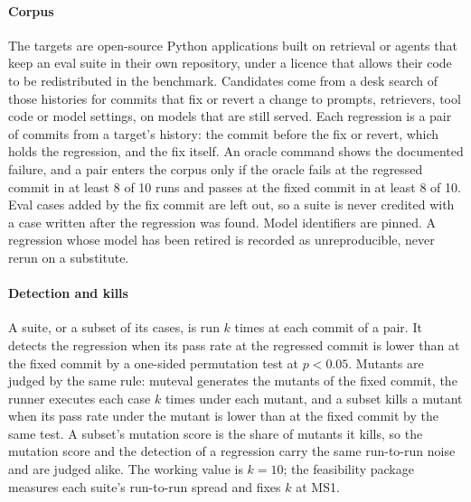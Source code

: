 \documentclass[11pt]{article}
\begin{document}
\paragraph{Corpus} The targets are open-source Python applications built on retrieval or agents that keep an eval suite in their own repository, under a licence that allows their code to be redistributed in the benchmark. Candidates come from a desk search of those histories for commits that fix or revert a change to prompts, retrievers, tool code or model settings, on models that are still served. Each regression is a pair of commits from a target's history: the commit before the fix or revert, which holds the regression, and the fix itself. An oracle command shows the documented failure, and a pair enters the corpus only if the oracle fails at the regressed commit in at least 8 of 10 runs and passes at the fixed commit in at least 8 of 10. Eval cases added by the fix commit are left out, so a suite is never credited with a case written after the regression was found. Model identifiers are pinned. A regression whose model has been retired is recorded as unreproducible, never rerun on a substitute.

\paragraph{Detection and kills} A suite, or a subset of its cases, is run $k$ times at each commit of a pair. It detects the regression when its pass rate at the regressed commit is lower than at the fixed commit by a one-sided permutation test at $p < 0.05$. Mutants are judged by the same rule: muteval generates the mutants of the fixed commit, the runner executes each case $k$ times under each mutant, and a subset kills a mutant when its pass rate under the mutant is lower than at the fixed commit by the same test. A subset's mutation score is the share of mutants it kills, so the mutation score and the detection of a regression carry the same run-to-run noise and are judged alike. The working value is $k = 10$; the feasibility package measures each suite's run-to-run spread and fixes $k$ at MS1.
\end{document}
